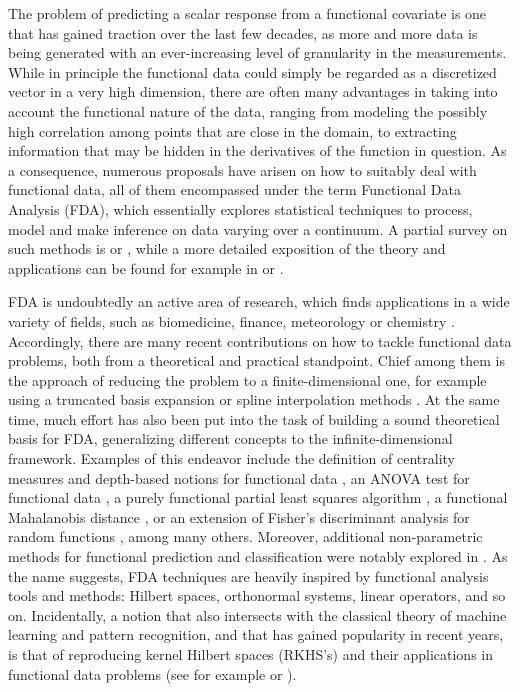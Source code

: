 \documentclass{article}
\numberwithin{equation}{section}
\theoremstyle{plain}
\begin{document}
The problem of predicting a scalar response from a functional covariate is one that has gained traction over the last few decades, as more and more data is being generated with an ever-increasing level of granularity in the measurements. While in principle the functional data could simply be regarded as a discretized vector in a very high dimension, there are often many advantages in taking into account the functional nature of the data, ranging from modeling the possibly high correlation among points that are close in the domain, to extracting information that may be hidden in the derivatives of the function in question. As a consequence, numerous proposals have arisen on how to suitably deal with functional data, all of them encompassed under the term Functional Data Analysis (FDA), which essentially explores statistical techniques to process, model and make inference on data varying over a continuum. A partial survey on such methods is \citet{cuevas2014partial} or \citet{goia2016introduction}, while a more detailed exposition of the theory and applications can be found for example in \citet{ramsay2005functional} or \citet{hsing2015theoretical}.

FDA is undoubtedly an active area of research, which finds applications in a wide variety of fields, such as biomedicine, finance, meteorology or chemistry \citep[see for example][]{ullah2013applications}. Accordingly, there are many recent contributions on how to tackle functional data problems, both from a theoretical and practical standpoint. Chief among them is the approach of reducing the problem to a finite-dimensional one, for example using a truncated basis expansion or spline interpolation methods \citep[e.g.][]{muller2005generalized, aguilera2013comparative}. At the same time, much effort has also been put into the task of building a sound theoretical basis for FDA, generalizing different concepts to the infinite-dimensional framework. Examples of this endeavor include the definition of centrality measures and depth-based notions for functional data \citep[e.g.][]{fraiman2001trimmed, cuevas2007robust, lopez2009concept}, an ANOVA test for functional data \citep{cuevas2004anova}, a purely functional partial least squares algorithm \citep{delaigle2012methodology}, a functional Mahalanobis distance \citep[e.g.][]{galeano2015mahalanobis, berrendero2020mahalanobis}, or an extension of Fisher's discriminant analysis for random functions \citep[e.g.][]{james2001functional, shin2008extension}, among many others. Moreover, additional non-parametric methods for functional prediction and classification were notably explored in \citet{ferraty2006nonparametric}. As the name suggests, FDA techniques are heavily inspired by functional analysis tools and methods: Hilbert spaces, orthonormal systems, linear operators, and so on. Incidentally, a notion that also intersects with the classical theory of machine learning and pattern recognition, and that has gained popularity in recent years, is that of reproducing kernel Hilbert spaces (RKHS's) and their applications in functional data problems (see for example \citealp{yuan2010reproducing} or \citealp{berrendero2018use, berrendero2020general}).
\end{document}

